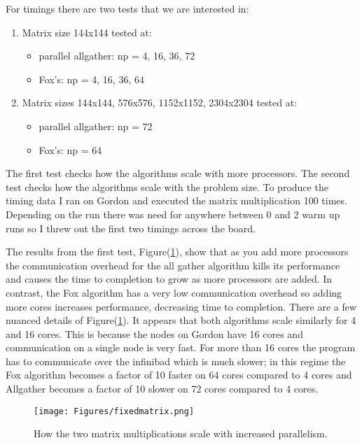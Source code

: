 \documentclass[11pt,a4paper,oneside]{report}
\begin{document}
\pagebreak

For timings there are two tests that we are interested in:
\begin{enumerate}
  \item Matrix size 144x144 tested at:
    \begin{itemize}
      \item parallel allgather: np = 4, 16, 36, 72
      \item Fox’s: np = 4, 16, 36, 64
    \end{itemize}
  \item Matrix sizes 144x144, 576x576, 1152x1152, 2304x2304 tested at:
    \begin{itemize}
      \item parallel allgather: np = 72
      \item Fox’s: np = 64
    \end{itemize}
\end{enumerate}

The first test checks how the algorithms scale with more processors.  The second test checks how the algorithms scale with the problem size.  To produce the timing data I ran on Gordon and executed the matrix multiplication 100 times.  Depending on the run there was need for anywhere between 0 and 2 warm up runs so I threw out the first two timings across the board.

The results from the first test, Figure(\ref{fig:fixedmatrix}), show that as you add more processors the communication overhead for the all gather algorithm kills its performance and causes the time to completion to grow as more processors are added.  In contrast, the Fox algorithm has a very low communication overhead so adding more cores increases performance, decreasing time to completion.  There are a few nuanced details of Figure(\ref{fig:fixedmatrix}).  It appears that both algorithms scale similarly for 4 and 16 cores.  This is because the nodes on Gordon have 16 cores and communication on a single node is very fast.  For more than 16 cores the program has to communicate over the infinibad which is much slower; in this regime the Fox algorithm becomes a factor of 10 faster on 64 cores compared to 4 cores and Allgather becomes a factor of 10 slower on 72 cores compared to 4 cores.

\begin{figure}[htpb]
  \centering
  \texttt{[image: Figures/fixedmatrix.png]}
  \caption{How the two matrix multiplications scale with increased parallelism.}
  \label{fig:fixedmatrix}
\end{figure}
\end{document}
